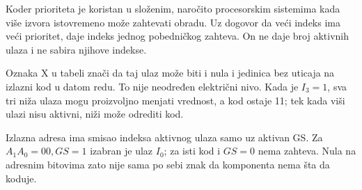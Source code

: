 
Koder prioriteta je koristan u složenim, naročito procesorskim sistemima kada više izvora istovremeno može zahtevati obradu. Uz dogovor da veći indeks ima veći prioritet, daje indeks jednog pobedničkog zahteva. On ne daje broj aktivnih ulaza i ne sabira njihove indekse.

Oznaka X u tabeli znači da taj ulaz može biti i nula i jedinica bez uticaja na izlazni kod u datom redu. To nije neodređen električni nivo. Kada je \(I_3=1\), sva tri niža ulaza mogu proizvoljno menjati vrednost, a kod ostaje 11; tek kada viši ulazi nisu aktivni, niži može odrediti kod.

Izlazna adresa ima smisao indeksa aktivnog ulaza samo uz aktivan GS. Za \(A_1A_0=00,GS=1\) izabran je ulaz \(I_0\); za isti kod i \(GS=0\) nema zahteva. Nula na adresnim bitovima zato nije sama po sebi znak da komponenta nema šta da koduje.
